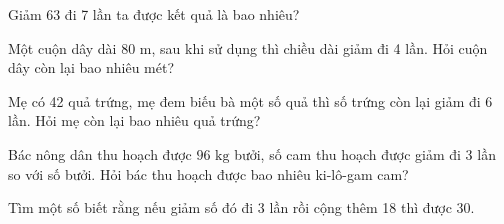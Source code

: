 \begin{ex} %
Giảm 63 đi 7 lần ta được kết quả là bao nhiêu?
\end{ex}

\begin{ex} %
Một cuộn dây dài $80\text{ m}$, sau khi sử dụng thì chiều dài giảm đi 4 lần. Hỏi cuộn dây còn lại bao nhiêu mét?
\end{ex}

\begin{ex} %
Mẹ có 42 quả trứng, mẹ đem biếu bà một số quả thì số trứng còn lại giảm đi 6 lần. Hỏi mẹ còn lại bao nhiêu quả trứng?
\end{ex}

\begin{ex} %
Bác nông dân thu hoạch được $96\text{ kg}$ bưởi, số cam thu hoạch được giảm đi 3 lần so với số bưởi. Hỏi bác thu hoạch được bao nhiêu ki-lô-gam cam?
\end{ex}

\begin{ex} %
Tìm một số biết rằng nếu giảm số đó đi 3 lần rồi cộng thêm 18 thì được 30.
\end{ex}
